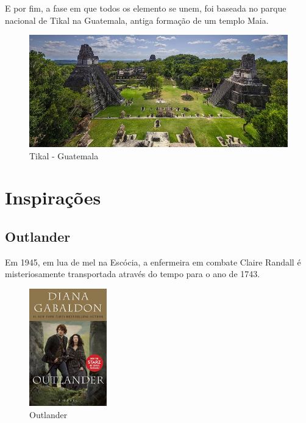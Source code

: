 E por fim, a fase em que todos os elemento se unem, foi baseada no parque nacional de Tikal na Guatemala, antiga formação de um templo Maia.

\clearpage

\begin{figure}[htb]
    \caption{\label{fig_mundoHub}Tikal - Guatemala}
    \begin{center}
        \includegraphics[width=\textwidth]{imagens/tikal.jpg}
    \end{center}
\end{figure}


\section{Inspirações}


\subsection{Outlander}

Em 1945, em lua de mel na Escócia, a enfermeira em combate Claire Randall é
misteriosamente transportada através do tempo para o ano de 1743.

\begin{figure}[!htb] \caption{\label{Outlander}Outlander} \begin{center}
\includegraphics[width=0.3\textwidth]{imagens/outlander.jpg} \end{center}
 \end{figure}

